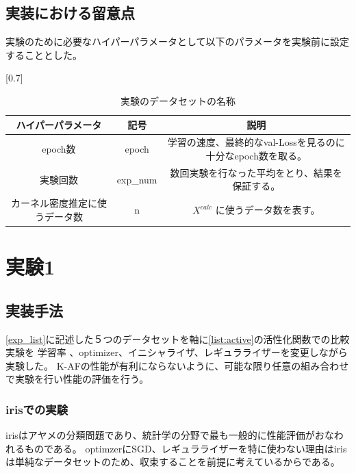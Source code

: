 \subsection{実装における留意点}
実験のために必要なハイパーパラメータとして以下のパラメータを実験前に設定することとした。

\begin{table}[htbp]
    \begin{center}
        \caption{実験のデータセットの名称}
        \vspace{5mm} 
        \scalebox{0.7}[0.7]{
            \begin{tabular}{||c | c |c||}
            ハイパーパラメータ & 記号 & 説明 \\
            \hline
            epoch数                           & epoch       & 学習の速度、最終的なval-Lossを見るのに十分なepoch数を取る。  \\
            実験回数                           & exp\_num     & 数回実験を行なった平均をとり、結果を保証する。 \\
            カーネル密度推定に使うデータ数        & n           & $ X^{calc} $ に使うデータ数を表す。  \\
            \end{tabular}
        }
    \end{center}
\end{table}






\section{実験1}
\label{exp1}
\subsection{実装手法}

\ref{exp_list}に記述した５つのデータセットを軸に\ref{list:active}の活性化関数での比較実験を
学習率 、optimizer、イニシャライザ、レギュラライザーを変更しながら実験した。
K-AFの性能が有利にならないように、可能な限り任意の組み合わせで実験を行い性能の評価を行う。

\subsubsection{irisでの実験}

irisはアヤメの分類問題であり、統計学の分野で最も一般的に性能評価がおなわれるものである。
optimzerにSGD、レギュラライザーを特に使わない理由はirisは単純なデータセットのため、収束することを前提に考えているからである。


